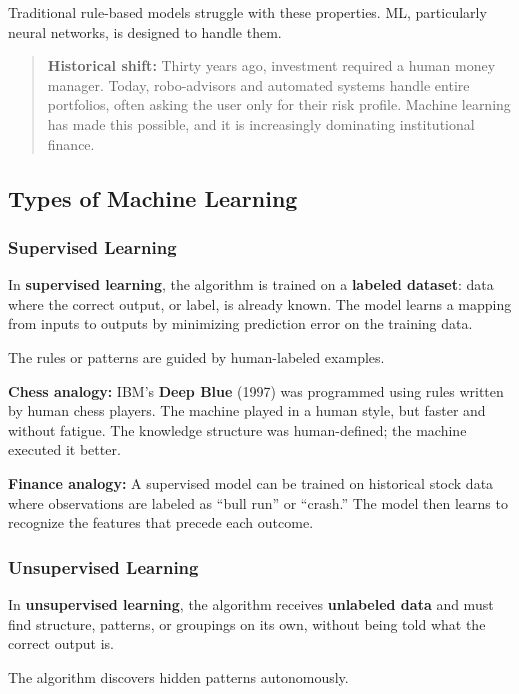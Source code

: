 \documentclass[12pt,openany]{book}
\begin{document}
Traditional rule-based models struggle with these properties. ML, particularly neural networks, is designed to handle them.

\begin{quote}
\textbf{Historical shift:} Thirty years ago, investment required a human money manager. Today, robo-advisors and automated systems handle entire portfolios, often asking the user only for their risk profile. Machine learning has made this possible, and it is increasingly dominating institutional finance.
\end{quote}

\subsection{Types of Machine Learning}

\subsubsection{Supervised Learning}

In \textbf{supervised learning}, the algorithm is trained on a \textbf{labeled dataset}: data where the correct output, or label, is already known. The model learns a mapping from inputs to outputs by minimizing prediction error on the training data.

The rules or patterns are guided by human-labeled examples.

\textbf{Chess analogy:} IBM's \textbf{Deep Blue} (1997) was programmed using rules written by human chess players. The machine played in a human style, but faster and without fatigue. The knowledge structure was human-defined; the machine executed it better.

\textbf{Finance analogy:} A supervised model can be trained on historical stock data where observations are labeled as ``bull run'' or ``crash.'' The model then learns to recognize the features that precede each outcome.

\subsubsection{Unsupervised Learning}

In \textbf{unsupervised learning}, the algorithm receives \textbf{unlabeled data} and must find structure, patterns, or groupings on its own, without being told what the correct output is.

The algorithm discovers hidden patterns autonomously.
\end{document}
